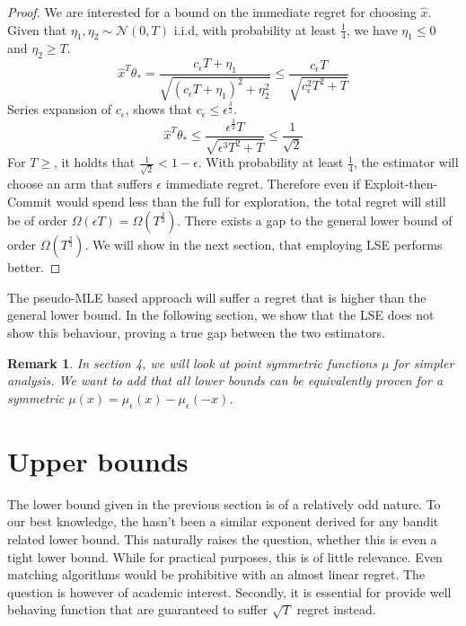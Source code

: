 \documentclass[twoside]{article} \usepackage{aistats2017}
\newtheorem{remark}{Remark}
\begin{document}
\begin{proof}
    We are interested for a bound on the immediate regret for choosing $\hat{x}$. Given that $\eta_1,\eta_2\sim \mathcal{N}(0,T)$ i.i.d, with probability at least $\frac{1}{4}$, we have $\eta_1\leq0$ and $\eta_2 \geq T$.
    $$
    \hat{x}^T\theta_* = \frac{c_\epsilon T+\eta_1}{\sqrt{(c_\epsilon T+\eta_1)^2+\eta_2^2}}\leq \frac{c_\epsilon T}{\sqrt{c^2_\epsilon T^2 + T}}
    $$
    Series expansion of $c_\epsilon$, shows that $c_\epsilon\leq\epsilon^{\frac{3}{2}}$.
    $$
    \hat{x}^T\theta_*\leq \frac{\epsilon^{\frac{3}{2}}T}{\sqrt{\epsilon^3T^2+T}}\leq \frac{1}{\sqrt{2}}
    $$
    For $T\geq $, it holdts that $\frac{1}{\sqrt{2}}<1-\epsilon$. With probability at least $\frac{1}{4}$, the estimator will  choose an arm that suffers $\epsilon$ immediate regret. Therefore even if Exploit-then-Commit would spend less than the full for exploration, the total regret will still be of order $\Omega(\epsilon T)=\Omega (T^{\frac{2}{3}})$. There exists a gap to the general lower bound of order $\Omega (T^{\frac{2}{3}})$. We will show in the next section, that employing LSE performs better.
    
    
    
    
\end{proof}

The pseudo-MLE based approach will suffer a regret that is higher than the general lower bound. In the following section, we show that the LSE does not show this behaviour, proving a true gap between the two estimators.
\begin{remark}
In section 4, we will look at point symmetric functions $\mu$ for simpler analysis. We want to add that all lower bounds can be equivalently proven for a symmetric $\mu(x) = \mu_\epsilon(x)-\mu_\epsilon(-x)$.
\end{remark}
\section{Upper bounds}\label{upperBounds}
The lower bound given in the previous section is of a relatively odd nature. 
To our best knowledge, the hasn't been a similar exponent derived for any bandit related lower bound.
This naturally raises the question, whether this is even a tight lower bound.
While for practical purposes, this is of little relevance. Even matching algorithms would be prohibitive with an almost linear regret. The question is however of academic interest.
Secondly, it is essential for provide well behaving function that are guaranteed to suffer $\sqrt{T}$ regret instead.
\end{document}
